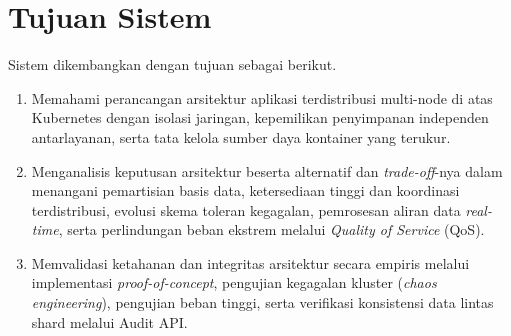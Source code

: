 \section{Tujuan Sistem}
Sistem dikembangkan dengan tujuan sebagai berikut.
\begin{enumerate}
    \item Memahami perancangan arsitektur aplikasi terdistribusi multi-node di atas Kubernetes dengan isolasi jaringan, kepemilikan penyimpanan independen antarlayanan, serta tata kelola sumber daya kontainer yang terukur.
    \item Menganalisis keputusan arsitektur beserta alternatif dan \textit{trade-off}-nya dalam menangani pemartisian basis data, ketersediaan tinggi dan koordinasi terdistribusi, evolusi skema toleran kegagalan, pemrosesan aliran data \textit{real-time}, serta perlindungan beban ekstrem melalui \textit{Quality of Service} (QoS).
    \item Memvalidasi ketahanan dan integritas arsitektur secara empiris melalui implementasi \textit{proof-of-concept}, pengujian kegagalan kluster (\textit{chaos engineering}), pengujian beban tinggi, serta verifikasi konsistensi data lintas shard melalui Audit API.
\end{enumerate}

